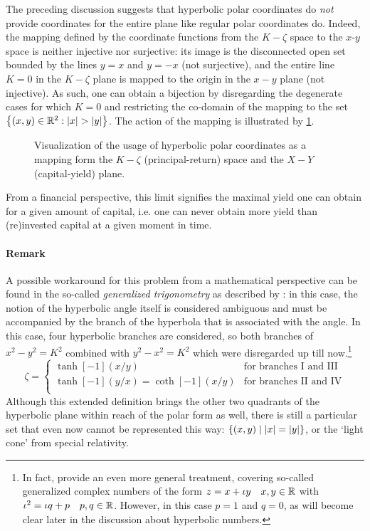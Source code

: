 The preceding discussion suggests that hyperbolic polar coordinates do \emph{not} provide coordinates for the entire plane like regular polar coordinates do. Indeed, the mapping defined by the coordinate functions from the \(K-\zeta\) space to the \(x\)-\(y\) space is neither injective nor surjective: its image is the disconnected open set bounded by the lines \(y = x\) and \(y = -x\) (not surjective), and the entire line \(K = 0\) in the \(K-\zeta\) plane is mapped to the origin in the \(x-y\) plane (not injective). As such, one can obtain a bijection by disregarding the degenerate cases for which \(K = 0\) and restricting the co-domain of the mapping to the set \(\qty{(x, y) \in \real^2: \abs{x} > \abs{y}}\). The action of the mapping is illustrated by \cref{fig:polar_coords}.
\begin{figure}[ht]
    \centering
    
    \caption{Visualization of the usage of hyperbolic polar coordinates as a mapping form the $K-\zeta$ (principal-return) space and the $X-Y$ (capital-yield) plane.}
    \label{fig:polar_coords}
\end{figure}
From a financial perspective, this limit signifies the maximal yield one can obtain for a given amount of capital, i.e. one can never obtain more yield than (re)invested capital at a given moment in time.

\paragraph{Remark} A possible workaround for this problem from a mathematical perspective can be found in the so-called \emph{generalized trigonometry} as described by \citet{Harkin2004}: in this case, the notion of the hyperbolic angle itself is considered ambiguous and must be accompanied by the branch of the hyperbola that is associated with the angle. In this case, four hyperbolic branches are considered, so both branches of \(x^2 - y^2 = K^2\) combined with \(y^2 - x^2 = K^2\) which were disregarded up till now.\footnote{In fact, \citeauthor{Harkin2004} provide an even more general treatment, covering so-called generalized complex numbers of the form \(z = x + \iota y\quad x, y \in \mathbb{R}\) with \(\iota^2 = \iota q + p\quad p, q \in \mathbb{R}\). However, in this case \(p = 1\) and \(q = 0\), as will become clear later in the discussion about hyperbolic numbers.}
\begin{equation}
    \zeta = 
    \begin{cases}
        \tanh[-1](x/y) & \text{for branches I and III}\\
        \tanh[-1](y/x) = \coth[-1](x/y) & \text{for branches II and IV}\\
    \end{cases}
\end{equation}
Although this extended definition brings the other two quadrants of the hyperbolic plane within reach of the polar form as well, there is still a particular set that even now cannot be represented this way: \(\qty{(x, y)\mid \abs{x} = \abs{y}}\), or the `light cone' from special relativity.

